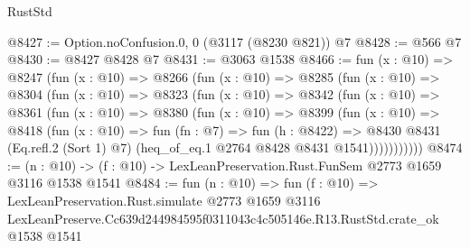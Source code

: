 \begin{lexlean}{RustStd}
\begin{coremodule}
@8427 := Option.noConfusion.{0, 0} (@3117 (@8230 @821)) @7
@8428 := @566 @7
@8430 := @8427 @8428 @7
@8431 := @3063 @1538
@8466 := fun (x : @10) =>
  @8247
    (fun (x : @10) =>
    @8266
      (fun (x : @10) =>
      @8285
        (fun (x : @10) =>
        @8304
          (fun (x : @10) =>
          @8323
            (fun (x : @10) =>
            @8342
              (fun (x : @10) =>
              @8361
                (fun (x : @10) =>
                @8380
                  (fun (x : @10) =>
                  @8399
                    (fun (x : @10) =>
                    @8418
                      (fun (x : @10) =>
                      fun (fn : @7) =>
                      fun (h : @8422) =>
                      @8430
                        @8431
                        (Eq.refl.{2} (Sort 1) @7)
                        (heq_of_eq.{1} @2764 @8428 @8431 @1541)))))))))))
@8474 := (n : @10) -> (f : @10) -> LexLeanPreservation.Rust.FunSem @2773 @1659 @3116 @1538 @1541
@8484 := fun (n : @10) =>
  fun (f : @10) =>
  LexLeanPreservation.Rust.simulate
    @2773
    @1659
    @3116
    LexLeanPreserve.Cc639d244984595f0311043c4c505146e.R13.RustStd.crate_ok
    @1538
    @1541
\end{coremodule}
\end{lexlean}
